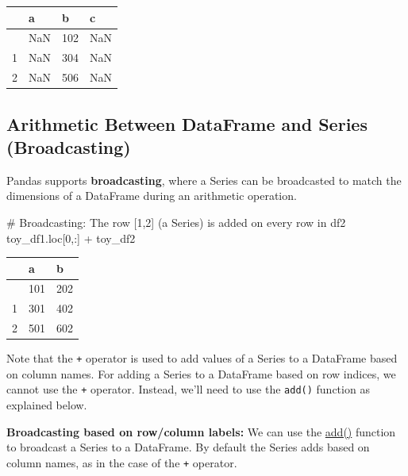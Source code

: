 \documentclass[
  letterpaper,
  DIV=11,
  numbers=noendperiod]{scrreprt}
\newenvironment{Shaded}{\begin{snugshade}}{\end{snugshade}}
\newcommand{\CommentTok}[1]{\textcolor[rgb]{0.37,0.37,0.37}{#1}}
\newcommand{\DecValTok}[1]{\textcolor[rgb]{0.68,0.00,0.00}{#1}}
\newcommand{\NormalTok}[1]{\textcolor[rgb]{0.00,0.23,0.31}{#1}}
\newcommand{\OperatorTok}[1]{\textcolor[rgb]{0.37,0.37,0.37}{#1}}
\begin{document}
\begin{longtable}[]{@{}llll@{}}
\toprule\noalign{}
& a & b & c \\
\midrule\noalign{}
\endhead
\bottomrule\noalign{}
\endlastfoot
0 & NaN & 102 & NaN \\
1 & NaN & 304 & NaN \\
2 & NaN & 506 & NaN \\
\end{longtable}

\hypertarget{arithmetic-between-dataframe-and-series-broadcasting}{%
\subsection{Arithmetic Between DataFrame and Series
(Broadcasting)}\label{arithmetic-between-dataframe-and-series-broadcasting}}

Pandas supports \textbf{broadcasting}, where a Series can be broadcasted
to match the dimensions of a DataFrame during an arithmetic operation.

\begin{Shaded}
\begin{Highlighting}[]
\CommentTok{\# Broadcasting: The row [1,2] (a Series) is added on every row in df2 }
\NormalTok{toy\_df1.loc[}\DecValTok{0}\NormalTok{,:] }\OperatorTok{+}\NormalTok{ toy\_df2}
\end{Highlighting}
\end{Shaded}

\begin{longtable}[]{@{}lll@{}}
\toprule\noalign{}
& a & b \\
\midrule\noalign{}
\endhead
\bottomrule\noalign{}
\endlastfoot
0 & 101 & 202 \\
1 & 301 & 402 \\
2 & 501 & 602 \\
\end{longtable}

Note that the \texttt{+} operator is used to add values of a Series to a
DataFrame based on column names. For adding a Series to a DataFrame
based on row indices, we cannot use the \texttt{+} operator. Instead,
we'll need to use the \texttt{add()} function as explained below.

\textbf{Broadcasting based on row/column labels:} We can use the
\href{https://pandas.pydata.org/docs/reference/api/pandas.DataFrame.add.html}{add()}
function to broadcast a Series to a DataFrame. By default the Series
adds based on column names, as in the case of the \texttt{+} operator.
\end{document}
